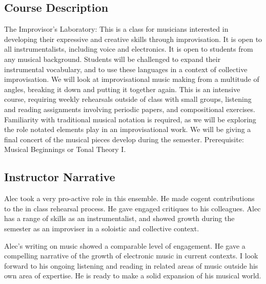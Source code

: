 

\subsection*{Course Description}
The Improvisor's Laboratory: This is a class for musicians interested in
developing their expressive and creative skills through improvisation.
It is open to all instrumentalists, including voice and electronics.
It is open to students from any musical background. Students will
be challenged to expand their instrumental vocabulary, and to use
these languages in a context of collective improvisation. We will
look at improvisational music making from a multitude of angles,
breaking it down and putting it together again. This is an intensive
course, requiring weekly rehearsals outside of class with small groups,
listening and reading assignments involving periodic papers, and
compositional exercises. Familiarity with traditional musical notation
is required, as we will be exploring the role notated elements play
in an improvisational work. We will be giving a final concert of the
musical pieces develop during the semester. Prerequisite: Musical
Beginnings or Tonal Theory I.

\subsection*{Instructor Narrative}
Alec took a very pro-active role in this ensemble. He made cogent
contributions to the in class rehearsal process. He gave engaged
critiques to his colleagues. Alec has a range of skills as an
instrumentalist, and showed growth during the semester as an improviser
in a soloistic and collective context.

Alec's writing on music showed a comparable level of engagement. He gave
a compelling narrative of the growth of electronic music in current
contexts. I look forward to his ongoing listening and reading in related
areas of music outside his own area of expertise. He is ready to make a
solid expansion of his musical world.
